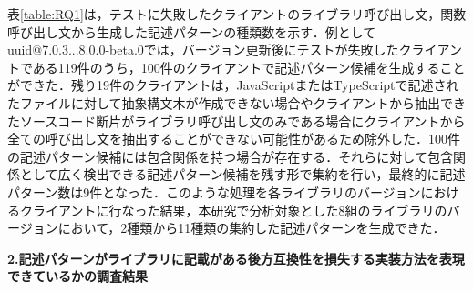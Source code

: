 \documentclass[11pt]{jreport}
\begin{document}
表\ref{table:RQ1}は，テストに失敗したクライアントのライブラリ呼び出し文，関数呼び出し文から生成した記述パターンの種類数を示す．例としてuuid@7.0.3...8.0.0-beta.0では，バージョン更新後にテストが失敗したクライアントである119件のうち，100件のクライアントで記述パターン候補を生成することができた．残り19件のクライアントは，JavaScriptまたはTypeScriptで記述されたファイルに対して抽象構文木が作成できない場合やクライアントから抽出できたソースコード断片がライブラリ呼び出し文のみである場合にクライアントから全ての呼び出し文を抽出することができない可能性があるため除外した．100件の記述パターン候補には包含関係を持つ場合が存在する．それらに対して包含関係として広く検出できる記述パターン候補を残す形で集約を行い，最終的に記述パターン数は9件となった．このような処理を各ライブラリのバージョンにおけるクライアントに行なった結果，本研究で分析対象とした8組のライブラリのバージョンにおいて，2種類から11種類の集約した記述パターンを生成できた．

\textbf{\newline\newline}
\noindent\textbf{2.記述パターンがライブラリに記載がある後方互換性を損失する実装方法を表現できているかの調査結果}
\end{document}
